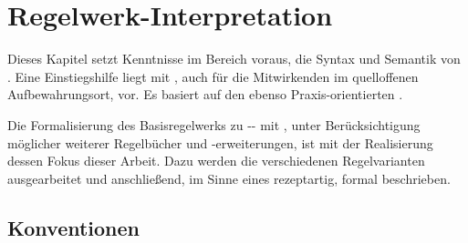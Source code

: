 \section{Regelwerk-Interpretation}\label{sec:regelwerk-interpretation}
\vspace{-.4em}
Dieses Kapitel setzt Kenntnisse im Bereich  voraus, \insb die Syntax und Semantik von .
Eine Einstiegshilfe liegt mit , auch für die Mitwirkenden im quelloffenen Aufbewahrungsort, vor.
Es basiert auf den ebenso Praxis-orientierten  .

Die Formalisierung des Basisregelwerks zu -- mit , unter Berücksichtigung möglicher weiterer Regelbücher und -erweiterungen, ist mit der Realisierung dessen Fokus dieser Arbeit.
Dazu werden die verschiedenen Regelvarianten ausgearbeitet und anschließend, im Sinne eines  rezeptartig, formal beschrieben.


\subsection{Konventionen}\label{subsec:konventionen}

